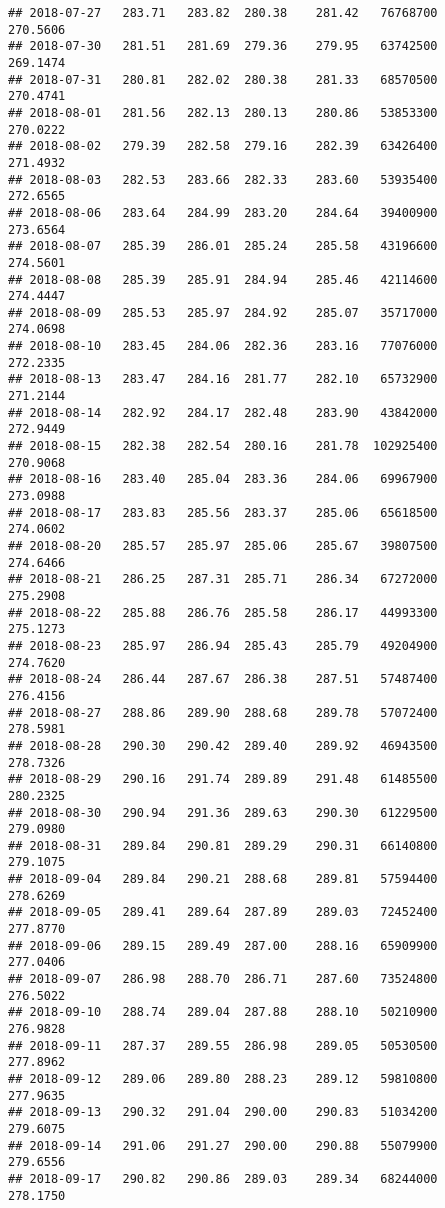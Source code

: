 \documentclass[
]{article}
\begin{document}
\begin{verbatim}
## 2018-07-27   283.71   283.82  280.38    281.42   76768700     270.5606
## 2018-07-30   281.51   281.69  279.36    279.95   63742500     269.1474
## 2018-07-31   280.81   282.02  280.38    281.33   68570500     270.4741
## 2018-08-01   281.56   282.13  280.13    280.86   53853300     270.0222
## 2018-08-02   279.39   282.58  279.16    282.39   63426400     271.4932
## 2018-08-03   282.53   283.66  282.33    283.60   53935400     272.6565
## 2018-08-06   283.64   284.99  283.20    284.64   39400900     273.6564
## 2018-08-07   285.39   286.01  285.24    285.58   43196600     274.5601
## 2018-08-08   285.39   285.91  284.94    285.46   42114600     274.4447
## 2018-08-09   285.53   285.97  284.92    285.07   35717000     274.0698
## 2018-08-10   283.45   284.06  282.36    283.16   77076000     272.2335
## 2018-08-13   283.47   284.16  281.77    282.10   65732900     271.2144
## 2018-08-14   282.92   284.17  282.48    283.90   43842000     272.9449
## 2018-08-15   282.38   282.54  280.16    281.78  102925400     270.9068
## 2018-08-16   283.40   285.04  283.36    284.06   69967900     273.0988
## 2018-08-17   283.83   285.56  283.37    285.06   65618500     274.0602
## 2018-08-20   285.57   285.97  285.06    285.67   39807500     274.6466
## 2018-08-21   286.25   287.31  285.71    286.34   67272000     275.2908
## 2018-08-22   285.88   286.76  285.58    286.17   44993300     275.1273
## 2018-08-23   285.97   286.94  285.43    285.79   49204900     274.7620
## 2018-08-24   286.44   287.67  286.38    287.51   57487400     276.4156
## 2018-08-27   288.86   289.90  288.68    289.78   57072400     278.5981
## 2018-08-28   290.30   290.42  289.40    289.92   46943500     278.7326
## 2018-08-29   290.16   291.74  289.89    291.48   61485500     280.2325
## 2018-08-30   290.94   291.36  289.63    290.30   61229500     279.0980
## 2018-08-31   289.84   290.81  289.29    290.31   66140800     279.1075
## 2018-09-04   289.84   290.21  288.68    289.81   57594400     278.6269
## 2018-09-05   289.41   289.64  287.89    289.03   72452400     277.8770
## 2018-09-06   289.15   289.49  287.00    288.16   65909900     277.0406
## 2018-09-07   286.98   288.70  286.71    287.60   73524800     276.5022
## 2018-09-10   288.74   289.04  287.88    288.10   50210900     276.9828
## 2018-09-11   287.37   289.55  286.98    289.05   50530500     277.8962
## 2018-09-12   289.06   289.80  288.23    289.12   59810800     277.9635
## 2018-09-13   290.32   291.04  290.00    290.83   51034200     279.6075
## 2018-09-14   291.06   291.27  290.00    290.88   55079900     279.6556
## 2018-09-17   290.82   290.86  289.03    289.34   68244000     278.1750

\end{verbatim}
\end{document}

